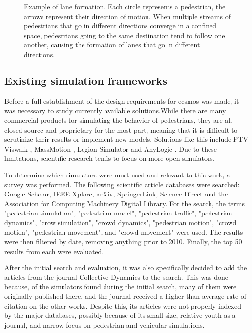 \documentclass[twoside, 11pt]{article}
\begin{document}
\begin{figure}[!h]
  \centering
  
  \caption[Example of lane formation]{Example of lane formation. Each circle represents a pedestrian, the arrows represent their direction of motion. When multiple streams of pedestrians that go in different directions converge in a confined space, pedestrians going to the same destination tend to follow one another, causing the formation of lanes that go in different directions.}
  \label{fig:lane-formation}
\end{figure}

\subsection{Existing simulation frameworks} \label{sec:existing-frameworks}

Before a full establishment of the design requirements for \gls{ecsmos} was made, it was necessary to study currently available solutions.While there are many commercial products for simulating the behavior of pedestrians, they are all closed source and proprietary for the most part, meaning that it is difficult to scrutinize their results or implement new models. Solutions like this include PTV Viswalk \cite{viswalk}, MassMotion \cite{massmotion}, Legion Simulator \cite{legionsimulator} and AnyLogic \cite{anylogic}. Due to these limitations, scientific research tends to focus on more open simulators. 

To determine which simulators were most used and relevant to this work, a survey was performed. The following scientific article databases were searched: Google Scholar, IEEE Xplore, arXiv, SpringerLink, Science Direct and the Association for Computing Machinery Digital Library. For the search, the terms "pedestrian simulation", "pedestrian model", "pedestrian traffic", "pedestrian dynamics", "crow simulation", "crowd dynamics", "pedestrian motion", "crowd motion", "pedestrian movement", and "crowd movement" were used.
The results were then filtered by date, removing anything prior to 2010. Finally, the top 50 results from each were evaluated.

After the initial search and evaluation, it was also specifically decided to add the articles from the journal Collective Dynamics to the search. This was done because, of the simulators found during the initial search, many of them were originally published there, and the journal received a higher than average rate of citation on the other works. Despite this, its articles were not properly indexed by the major databases, possibly because of its small size, relative youth as a journal, and narrow focus on pedestrian and vehicular simulations. 
\end{document}
